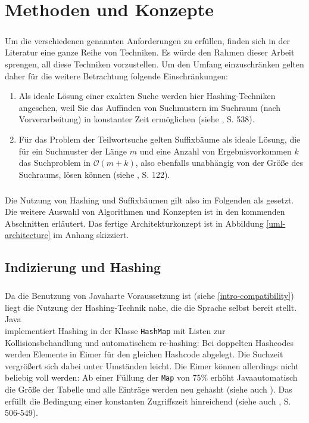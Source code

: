 
\chapter{Methoden und Konzepte}
\label{methoden}

\paragraph{} Um die verschiedenen genannten Anforderungen zu erfüllen, finden sich in der Literatur eine ganze Reihe von Techniken. Es würde den Rahmen dieser Arbeit sprengen, all diese Techniken vorzustellen. Um den Umfang einzuschränken gelten daher für die weitere Betrachtung folgende Einschränkungen:
\begin{enumerate}
\item Als ideale Lösung einer exakten Suche werden hier Hashing-Techniken angesehen, weil Sie das Auffinden von Suchmustern im Suchraum (nach Vorverarbeitung) in konstanter Zeit ermöglichen (siehe \cite{knuth}, S. 538).
\item Für das Problem der Teilwortsuche gelten Suffixbäume als ideale Lösung, die für ein Suchmuster der Länge $m$ und eine Anzahl von Ergebnisvorkommen $k$ das Suchproblem in $\mathcal{O}(m + k)$, also ebenfalls unabhängig von der Größe des Suchraums, lösen können (siehe \cite{gusfield}, S. 122).
\end{enumerate}
\paragraph{} Die Nutzung von Hashing und Suffixbäumen gilt also im Folgenden als gesetzt. Die weitere Auswahl von Algorithmen und Konzepten ist in den kommenden Abschnitten erläutert. Das fertige Architekturkonzept ist in Abbildung \ref{uml-architecture} im Anhang skizziert.

\section{Indizierung und Hashing}
\label{meth-hashing}

\paragraph{} Da die Benutzung von Java\texttrademark harte Voraussetzung ist (siehe \ref{intro-compatibility}) liegt die Nutzung der Hashing-Technik nahe, die die Sprache selbst bereit stellt. Java\texttrademark\\ implementiert Hashing in der Klasse \texttt{HashMap} mit Listen zur Kollisionsbehandlung und automatischem re-hashing: Bei doppelten Hashcodes werden Elemente in Eimer für den gleichen Hashcode abgelegt. Die Suchzeit vergrößert sich dabei unter Umständen leicht. Die Eimer können allerdings nicht beliebig voll werden: Ab einer Füllung der \texttt{Map} von 75\% erhöht Java\texttrademark automatisch die Größe der Tabelle und alle Einträge werden neu gehasht (siehe auch \cite{javaHashMap}). Das erfüllt die Bedingung einer konstanten Zugriffszeit hinreichend (siehe auch \cite{knuth}, S. 506-549).


